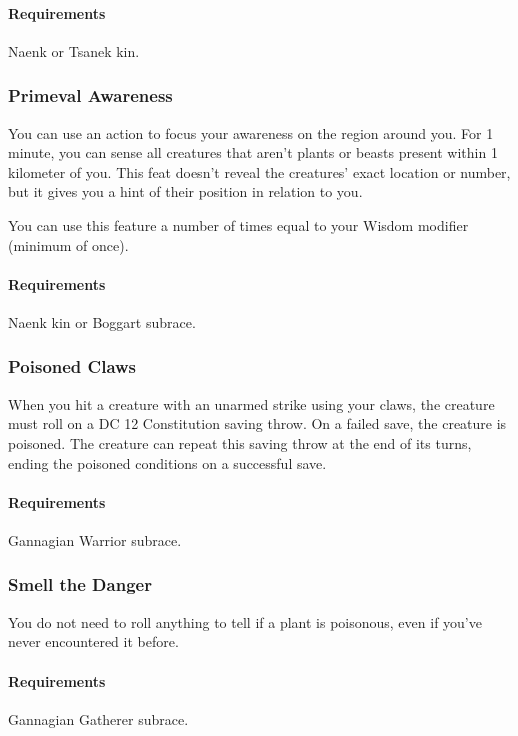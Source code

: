        \paragraph{Requirements} Naenk or Tsanek kin.
    \subsubsection{Primeval Awareness} \label{feat::primevalawareness}
        You can use an action to focus your awareness on the region around you.
        For 1 minute, you can sense all creatures that aren't plants or beasts present within 1 kilometer of you.
        This feat doesn't reveal the creatures' exact location or number, but it gives you a hint of their position in relation to you.

        You can use this feature a number of times equal to your Wisdom modifier (minimum of once).
        \paragraph{Requirements} Naenk kin or Boggart subrace.
    \subsubsection{Poisoned Claws} \label{feat::poisonedclaws}
        When you hit a creature with an unarmed strike using your claws, the creature must roll on a DC 12 Constitution saving throw.
        On a failed save, the creature is poisoned.
        The creature can repeat this saving throw at the end of its turns, ending the poisoned conditions on a successful save.
        \paragraph{Requirements} Gannagian Warrior subrace.
    \subsubsection{Smell the Danger} \label{feat::smellthedanger}
        You do not need to roll anything to tell if a plant is poisonous, even if you've never encountered it before.
        \paragraph{Requirements} Gannagian Gatherer subrace.
